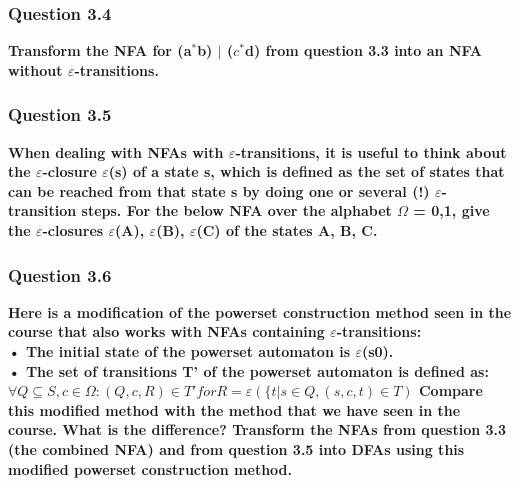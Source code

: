            

        \subsubsection{Question 3.4}
            \textbf{Transform the NFA for (a$^{*}$b) $|$ ($c^{*}$d) from question 3.3 into an NFA without $\varepsilon$-transitions.}


        \subsubsection{Question 3.5}
            \textbf{When dealing with NFAs with $\varepsilon$-transitions, it is useful to think about the $\varepsilon$-closure $\varepsilon$(s) of a state s, which is defined as the set of states that can be reached from that state s by doing one or several (!) $\varepsilon$-transition steps. For the below NFA over the alphabet $\Omega$ = {0,1}, give the $\varepsilon$-closures $\varepsilon$(A), $\varepsilon$(B), $\varepsilon$(C) of the states A, B, C.}

        
            
        
        \subsubsection{Question 3.6}

            \textbf{Here is a modification of the powerset construction method seen in the course that also works with NFAs containing $\varepsilon$-transitions: \\
                • The initial state of the powerset automaton is $\varepsilon$({s0}). \\
                • The set of transitions T' of the powerset automaton is defined as:
                $\forall Q \subseteq S, c \in \Omega: (Q, c, R) \in T' for R = \varepsilon(\{t | s \in Q, (s, c, t) \in T)$
                Compare this modified method with the method that we have seen in the course. What is
                the difference?
                Transform the NFAs from question 3.3 (the combined NFA) and from question 3.5 into DFAs
                using this modified powerset construction method.}
    
